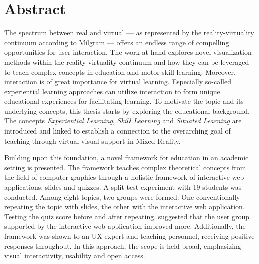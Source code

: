 %





\chapter*{Abstract}
\label{sec:abstract}
\vspace*{-10mm}

The spectrum between real and virtual --- as represented by the reality-virtuality continuum according to Milgram --- offers an endless range of compelling opportunities for user interaction.
The work at hand explores novel visualization methods within the reality-virtuality continuum and how they can be leveraged to teach complex concepts in education and motor skill learning.
Moreover, interaction is of great importance for virtual learning.
Especially so-called experiential learning approaches can utilize interaction to form unique educational experiences for facilitating learning.
To motivate the topic and its underlying concepts, this thesis starts by exploring the educational background.
The concepts \emph{Experiential Learning}, \emph{Skill Learning} and \emph{Situated Learning} are introduced and linked to establish a connection to the overarching goal of teaching through virtual visual support in Mixed Reality.

Building upon this foundation, a novel framework for education in an academic setting is presented.
The framework teaches complex theoretical concepts from the field of computer graphics through a holistic framework of interactive web applications, slides and quizzes.
A split test experiment with 19 students was conducted.
Among eight topics, two groups were formed: One conventionally repeating the topic with slides, the other with the interactive web application.
Testing the quiz score before and after repeating, suggested that the user group supported by the interactive web application improved more.
Additionally, the framework was shown to an UX-expert and teaching personnel, receiving positive responses throughout.
In this approach, the scope is held broad, emphasizing visual interactivity, usability and open access.

